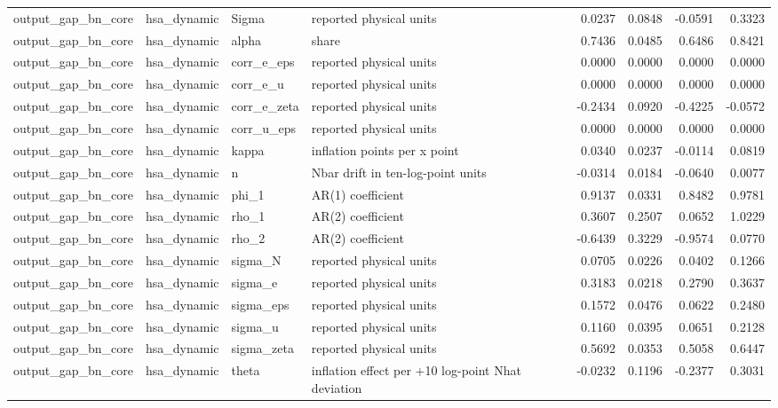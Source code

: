 \begin{tabular}{llllrrrr}
output\_gap\_bn\_core & hsa\_dynamic & Sigma & reported physical units & 0.0237 & 0.0848 & -0.0591 & 0.3323 \\
output\_gap\_bn\_core & hsa\_dynamic & alpha & share & 0.7436 & 0.0485 & 0.6486 & 0.8421 \\
output\_gap\_bn\_core & hsa\_dynamic & corr\_e\_eps & reported physical units & 0.0000 & 0.0000 & 0.0000 & 0.0000 \\
output\_gap\_bn\_core & hsa\_dynamic & corr\_e\_u & reported physical units & 0.0000 & 0.0000 & 0.0000 & 0.0000 \\
output\_gap\_bn\_core & hsa\_dynamic & corr\_e\_zeta & reported physical units & -0.2434 & 0.0920 & -0.4225 & -0.0572 \\
output\_gap\_bn\_core & hsa\_dynamic & corr\_u\_eps & reported physical units & 0.0000 & 0.0000 & 0.0000 & 0.0000 \\
output\_gap\_bn\_core & hsa\_dynamic & kappa & inflation points per x point & 0.0340 & 0.0237 & -0.0114 & 0.0819 \\
output\_gap\_bn\_core & hsa\_dynamic & n & Nbar drift in ten-log-point units & -0.0314 & 0.0184 & -0.0640 & 0.0077 \\
output\_gap\_bn\_core & hsa\_dynamic & phi\_1 & AR(1) coefficient & 0.9137 & 0.0331 & 0.8482 & 0.9781 \\
output\_gap\_bn\_core & hsa\_dynamic & rho\_1 & AR(2) coefficient & 0.3607 & 0.2507 & 0.0652 & 1.0229 \\
output\_gap\_bn\_core & hsa\_dynamic & rho\_2 & AR(2) coefficient & -0.6439 & 0.3229 & -0.9574 & 0.0770 \\
output\_gap\_bn\_core & hsa\_dynamic & sigma\_N & reported physical units & 0.0705 & 0.0226 & 0.0402 & 0.1266 \\
output\_gap\_bn\_core & hsa\_dynamic & sigma\_e & reported physical units & 0.3183 & 0.0218 & 0.2790 & 0.3637 \\
output\_gap\_bn\_core & hsa\_dynamic & sigma\_eps & reported physical units & 0.1572 & 0.0476 & 0.0622 & 0.2480 \\
output\_gap\_bn\_core & hsa\_dynamic & sigma\_u & reported physical units & 0.1160 & 0.0395 & 0.0651 & 0.2128 \\
output\_gap\_bn\_core & hsa\_dynamic & sigma\_zeta & reported physical units & 0.5692 & 0.0353 & 0.5058 & 0.6447 \\
output\_gap\_bn\_core & hsa\_dynamic & theta & inflation effect per +10 log-point Nhat deviation & -0.0232 & 0.1196 & -0.2377 & 0.3031 \\

\end{tabular}
